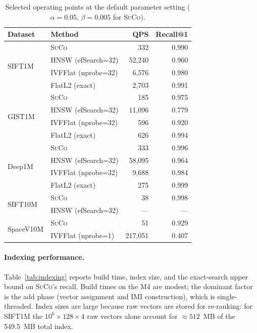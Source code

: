 \documentclass[11pt,a4paper]{article}
\newcommand{\suco}{\textsc{SuCo}}
\begin{document}
\begin{table}[H]
\centering
\caption{Selected operating points at the default parameter setting
  ($\alpha=0.05$, $\beta=0.005$ for \suco{}).}
\label{tab:operating_points}
\begin{tabular}{llrr}
\toprule
Dataset & Method & QPS & Recall@1 \\
\midrule
\multirow{4}{*}{SIFT1M}
  & \suco{}    &  332 & 0.990 \\
  & HNSW (efSearch=32)   & 52{,}240 & 0.960 \\
  & IVFFlat (nprobe=32)  &  6{,}576 & 0.980 \\
  & FlatL2 (exact)       &  2{,}703 & 0.991 \\
\midrule
\multirow{4}{*}{GIST1M}
  & \suco{}    &  185 & 0.975 \\
  & HNSW (efSearch=32)   & 11{,}096 & 0.779 \\
  & IVFFlat (nprobe=32)  &    596 & 0.920 \\
  & FlatL2 (exact)       &    626 & 0.994 \\
\midrule
\multirow{4}{*}{Deep1M}
  & \suco{}    &  333 & 0.996 \\
  & HNSW (efSearch=32)   & 58{,}095 & 0.964 \\
  & IVFFlat (nprobe=32)  &  9{,}688 & 0.984 \\
  & FlatL2 (exact)       &    275 & 0.999 \\
\midrule
\multirow{2}{*}{SIFT10M}
  & \suco{}    &   38 & 0.998 \\
  & HNSW (efSearch=32)   & --- & --- \\
\midrule
\multirow{2}{*}{SpaceV10M}
  & \suco{}    &   51 & 0.929 \\
  & IVFFlat (nprobe=1)   & 217{,}051 & 0.407 \\
\bottomrule
\end{tabular}
\end{table}

\paragraph{Indexing performance.}
Table~\ref{tab:indexing} reports build time, index size, and the
exact-search upper bound on \suco{}'s recall.  Build times on the M4 are
modest; the dominant factor is the add phase (vector assignment and IMI
construction), which is single-threaded.  Index sizes are large because raw
vectors are stored for re-ranking: for SIFT1M the $10^6 \times 128 \times 4$
raw vectors alone account for $\approx 512$~MB of the 549.5~MB total index.
\end{document}
